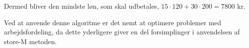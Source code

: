 \begin{eks}
Dermed bliver den mindste løn, som skal udbetales, $15 \cdot 120 + 30 \cdot 200 = 7800$ kr.

\end{eks}

Ved at anvende denne algoritme er det nemt at optimere problemer med arbejdsfordeling, da dette yderligere giver en del forsimplinger i anvendelsen af store-M metoden. 